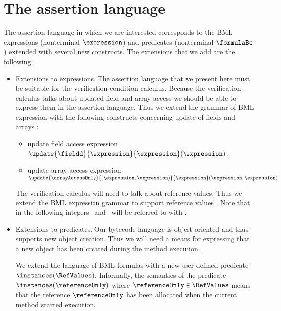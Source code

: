\section{The assertion language} \label{assertLang:lang}
The assertion language in which we are interested corresponds to the
BML  expressions (nonterminal $\expression$) and predicates 
(nonterminal $\formulaBc$) extended with several new constructs.
 The extensions that we add are the following:
\begin{itemize}
    \item Extensions to expressions. 
         The assertion language that we present here must be suitable for the verification condition calculus.
	 Because the verification calculus talks about updated field and array access
	 we should be able  to express  them in the assertion language. Thus we extend the grammar of BML expression
	 with the following constructs concerning update of fields and arrays :

        \begin{itemize}
	       \item update field access expression 
		  $\update{\fieldd}{ \expression}{\expression}(\expression)$.

	       \item update array access expression \\
                   $ \update{ \arrayAccessOnly}{ (\expression , \expression)}{ \expression} (\expression,\expression)$
	\end{itemize}

	The verification calculus will need to talk about reference values. Thus we extend the BML expression grammar to  support
	reference values \RefValues. Note that in the following integers \Myint\  and \RefValues \ will be referred to with \Values.
    \item Extensions to predicates. Our bytecode language is object oriented and thus supports new object creation. Thus we
          will need a means for expressing that a new object has been created during the method execution. 

	  We extend the language of BML  formulas
	  with a new user defined predicate $ \instances(\RefValues)$. Informally, the semantics of the predicate \\
	  $\instances(\referenceOnly)$ where $\referenceOnly \in \RefValues$
	  means that the reference $\referenceOnly  $  has been allocated when the current method started execution.
        
\end{itemize}

